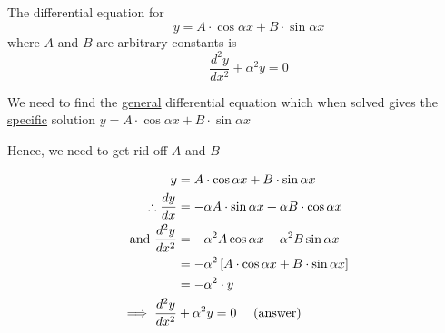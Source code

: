 \documentclass[14pt,fleqn]{extarticle}
\newcommand\fx{A\cdot\cos\alpha x + B\cdot\sin\alpha x}
\newcommand\dfx{-\alpha A\cdot\sin\alpha x + \alpha B\cdot\cos\alpha x}
\begin{document}
 
\begin{snippet}
    \correct
    
    The differential equation for 
    \[ \qquad y = \fx \]
    where $A$ and $B$ are arbitrary constants is 
    \[ \qquad \frac{d^2y}{dx^2} + \alpha^2 y = 0 \]
    \reason
    
    We need to find the \underline{general} differential equation which when solved gives the \underline{specific} solution $y = \fx$ \newline 
    
    Hence, we need to get rid off $A$ and $B$
    
    \begin{align}
	y &= \fx \\
	\therefore \dydx &= \dfx \\
	\text{and } \frac{d^2y}{dx^2} &= -\alpha^2 A \cos\alpha x - \alpha^2 B\sin\alpha x \\
	&= -\alpha^2 \left[\fx \right] \\
	&= -\alpha^2 \cdot y \\
	\implies\frac{d^2 y}{dx^2} &+ \alpha^2 y = 0 \quad\text{ (answer) }
\end{align}

\end{snippet} 
\end{document}
